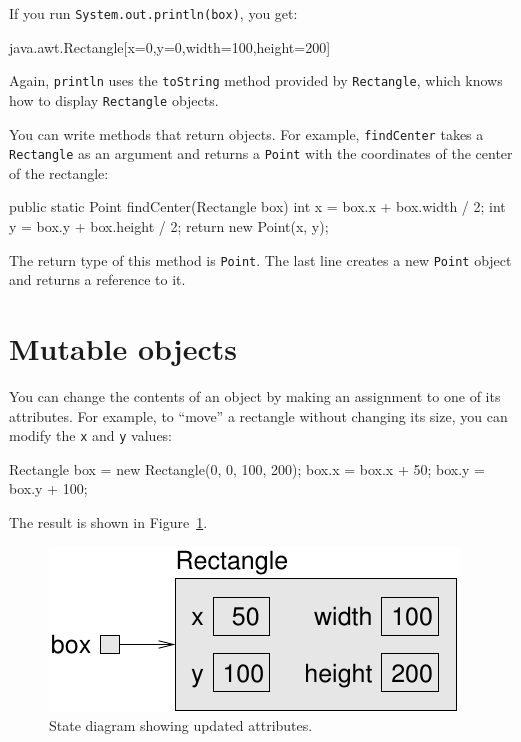 \documentclass[12pt]{book}
\theoremstyle{exercise}
\newcommand{\java}[1]{\verb"#1"}
\begin{document}
If you run \java{System.out.println(box)}, you get:

\begin{stdout}
java.awt.Rectangle[x=0,y=0,width=100,height=200]
\end{stdout}

Again, \java{println} uses the \java{toString} method provided by \java{Rectangle}, which knows how to display \java{Rectangle} objects.


You can write methods that return objects.
For example, \java{findCenter} takes a \java{Rectangle} as an argument and returns a \java{Point} with the coordinates of the center of the rectangle:

\begin{code}
    public static Point findCenter(Rectangle box) {
        int x = box.x + box.width / 2;
        int y = box.y + box.height / 2;
        return new Point(x, y);
    }
\end{code}

The return type of this method is \java{Point}.
The last line creates a new \java{Point} object and returns a reference to it.


\section{Mutable objects}


You can change the contents of an object by making an assignment to one of its attributes.
For example, to ``move'' a rectangle without changing its size, you can modify the \java{x} and \java{y} values:

\begin{code}
    Rectangle box = new Rectangle(0, 0, 100, 200);
    box.x = box.x + 50;
    box.y = box.y + 100;
\end{code}

The result is shown in Figure~\ref{fig.rectangle2}.

\begin{figure}
\begin{center}
\includegraphics{figs/rectangle2.pdf}
\caption{State diagram showing updated attributes.}
\label{fig.rectangle2}
\end{center}
\end{figure}
\end{document}
